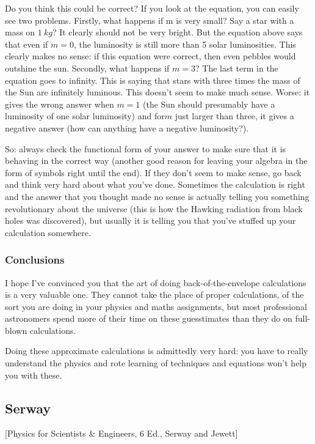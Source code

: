 \begin{enumerate}
Do you think this could be correct? If you look at the equation, you can easily see two problems. Firstly, what happens if m is very small? Say a star with a mass on $\SI{1}{kg}$? It clearly should not be very bright. But the equation above says that even if $m = 0$, the luminosity is still more than 5 solar luminosities. This clearly makes no sense: if this equation were correct, then even pebbles would outshine the sun. Secondly, what happens if $m = 3$? The last term in the equation goes to infinity. This is saying that stars with three times the mass of the Sun are infinitely luminous. This doesn't seem to make much sense. Worse: it gives the wrong answer when $m = 1$ (the Sun should presumably have a luminosity of one solar luminosity) and for$ m$ just larger than three, it gives a negative answer (how can anything have a negative luminosity?).

So: always check the functional form of your answer to make sure that it is behaving in the correct way (another good reason for leaving your algebra in the form of symbols right until the end). If they don't seem to make sense, go back and think very hard about what you've done. Sometimes the calculation is right and the answer that you thought made no sense is actually telling you something revolutionary about the universe (this is how the Hawking radiation from black holes was discovered), but usually it is telling you that you've stuffed up your calculation somewhere.
\end{enumerate}


\subsubsection{Conclusions}
I hope I've convinced you that the art of doing back-of-the-envelope calculations is a very valuable one. They cannot take the place of proper calculations, of the sort you are doing in your physics and maths assignments, but most professional astronomers spend more of their time on these guesstimates than they do on full-blown calculations.

Doing these approximate calculations is admittedly very hard: you have to really understand the physics and rote learning of techniques and equations won't help you with these. 


\subsection{Serway}
[Physics for Scientists \& Engineers, 6 Ed., Serway and Jewett]


